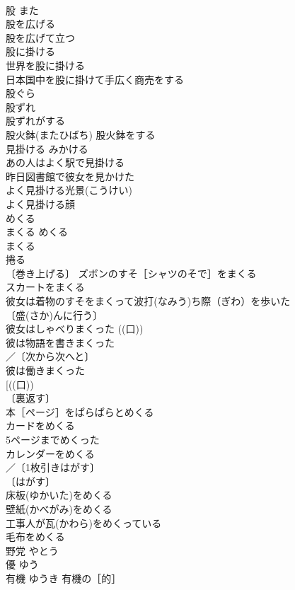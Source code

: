 \documentclass[8pt]{extreport}
\begin{document}
\begin{CJK}{UTF8}{min}
\\	股	また	
\\	股を広げる 
\\	股を広げて立つ 
\\	股に掛ける　
\\	世界を股に掛ける 
\\	日本国中を股に掛けて手広く商売をする 
\\	股ぐら 
\\	股ずれ 
\\	股ずれがする 
\\	股火鉢(またひばち) 股火鉢をする 
\\	見掛ける	みかける	
\\	あの人はよく駅で見掛ける 
\\	昨日図書館で彼女を見かけた 
\\	よく見掛ける光景(こうけい) 
\\	よく見掛ける顔 
\\	めくる 
\\	まくる	めくる 
\\	まくる	
\\	捲る 
\\	〔巻き上げる〕 ズボンのすそ［シャツのそで］をまくる 
\\	スカートをまくる 
\\	彼女は着物のすそをまくって波打(なみう)ち際（ぎわ）を歩いた 
\\	〔盛(さか)んに行う〕　
\\	彼女はしゃべりまくった ((口)) 
\\	彼は物語を書きまくった 
\\	／〔次から次へと〕
\\	彼は働きまくった 
\\	[((口)) 
\\	〔裏返す〕
\\	本［ページ］をぱらぱらとめくる 
\\	カードをめくる 
\\	5ページまでめくった 
\\	カレンダーをめくる 
\\	／〔1枚引きはがす〕
\\	〔はがす〕
\\	床板(ゆかいた)をめくる 
\\	壁紙(かべがみ)をめくる 
\\	工事人が瓦(かわら)をめくっている 
\\	毛布をめくる 
\\	野党	やとう	
\\	優	ゆう	
\\	有機	ゆうき	有機の［的］ 

\end{CJK}
\end{document}
